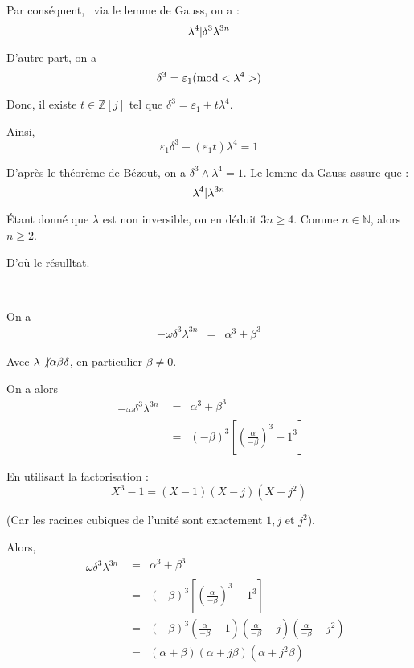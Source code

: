 Par cons{\'e}quent, \ via le lemme de Gauss, on a :
\[ \lambda^4 |  \delta^3 \lambda^{3 n} \]


D'autre part, on a
\[ \delta^3 = \varepsilon_1 (\operatorname{mod} < \lambda^4 >) \]


Donc, il existe $t \in \mathbb{Z} [j]$ tel que $\delta^3 = \varepsilon_1 + t
\lambda^4$.

Ainsi,
\[ \varepsilon_1 \delta^3 - (\varepsilon_1 t) \lambda^4 = 1 \]


D'apr{\`e}s le th{\'e}or{\`e}me de B{\'e}zout, on a $\delta^3 \wedge \lambda^4
= 1$. Le lemme da Gauss assure que :
\[ \lambda^4 |  \lambda^{3 n} \]


{\'E}tant donn{\'e} que $\lambda$ est non inversible, on en d{\'e}duit $3 n
\geqslant 4$. Comme $n \in \mathbb{N}$, alors $n \geqslant 2$.

D'o{\`u} le r{\'e}sulltat.

\

 On a
\[ \begin{array}{lll}
     - \omega \delta^3 \lambda^{3 n} & = & \alpha^3 + \beta^3
   \end{array} \]


Avec $\lambda \not{| } \alpha \beta \delta$, en particulier $\beta
\neq 0$.

On a alors
\begin{eqnarray*}
  \begin{array}{l}
    - \omega \delta^3 \lambda^{3 n}
  \end{array} & = & \alpha^3 + \beta^3\\
  & = & (- \beta)^3 \left[ \left( \frac{\alpha}{- \beta} \right)^3 - 1^3
  \right]
\end{eqnarray*}


En utilisant la factorisation :
\[ X^3 - 1 = (X - 1) (X - j) (X - j^2) \]


(Car les racines cubiques de l'unit{\'e} sont exactement $1, j$ et $j^2$).

Alors,
\begin{eqnarray*}
  \begin{array}{l}
    - \omega \delta^3 \lambda^{3 n}
  \end{array} & = & \alpha^3 + \beta^3\\
  & = & (- \beta)^3 \left[ \left( \frac{\alpha}{- \beta} \right)^3 - 1^3
  \right]\\
  & = & (- \beta)^3 \left( \frac{\alpha}{- \beta} - 1 \right) \left(
  \frac{\alpha}{- \beta} - j \right) \left( \frac{\alpha}{- \beta} - j^2
  \right)\\
  & = & (\alpha + \beta) (\alpha + j \beta) \left( \alpha + j^2 \beta \right)
\end{eqnarray*}


